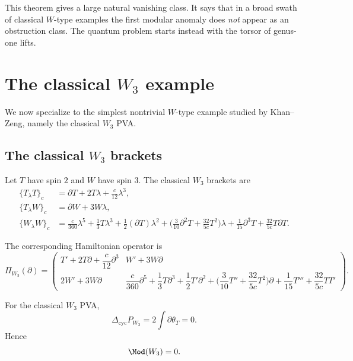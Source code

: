 \begin{remark}
This theorem gives a large natural vanishing class. It says that in a broad swath of
classical $W$-type examples the first modular anomaly does \emph{not} appear as an
obstruction class. The quantum problem starts instead with the torsor of genus-one lifts.
\end{remark}

\section{The classical $W_3$ example}

We now specialize to the simplest nontrivial $W$-type example studied by Khan--Zeng,
namely the classical $W_3$ PVA.

\subsection{The classical $W_3$ brackets}

Let $T$ have spin $2$ and $W$ have spin $3$. The classical $W_3$ brackets are
\cite{KZ25}
\begin{align}
\{T_\lambda T\}_c
&=
\partial T+2T\lambda+\frac{c}{12}\lambda^3,
\\[4pt]
\{T_\lambda W\}_c
&=
\partial W+3W\lambda,
\\[4pt]
\{W_\lambda W\}_c
&=
\frac{c}{360}\lambda^5
+\frac13 T\lambda^3
+\frac12(\partial T)\lambda^2
+\Big(\frac3{10}\partial^2T+\frac{32}{5c}T^2\Big)\lambda
+\frac1{15}\partial^3T
+\frac{32}{5c}T\partial T.
\end{align}

The corresponding Hamiltonian operator is
\[
\Pi_{W_3}(\partial)=
\begin{pmatrix}
T'+2T\partial+\dfrac c{12}\partial^3
&
W'+3W\partial
\\[2mm]
2W'+3W\partial
&
\dfrac c{360}\partial^5
+\dfrac13 T\partial^3
+\dfrac12 T'\partial^2
+\Big(\dfrac{3}{10}T''+\dfrac{32}{5c}T^2\Big)\partial
+\dfrac1{15}T'''
+\dfrac{32}{5c}TT'
\end{pmatrix}.
\]

\begin{theorem}\label{thm:W3mod0}
For the classical $W_3$ PVA,
\[
\Delta_{\mathrm{cyc}}P_{W_3}=2\int \partial\theta_T=0.
\]
Hence
\[
\Mod(W_3)=0.
\]
\end{theorem}

